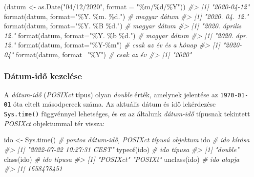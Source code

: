 \documentclass[
]{book}
\newenvironment{Shaded}{\begin{snugshade}}{\end{snugshade}}
\newcommand{\AttributeTok}[1]{\textcolor[rgb]{0.77,0.63,0.00}{#1}}
\newcommand{\CommentTok}[1]{\textcolor[rgb]{0.56,0.35,0.01}{\textit{#1}}}
\newcommand{\FunctionTok}[1]{\textcolor[rgb]{0.00,0.00,0.00}{#1}}
\newcommand{\NormalTok}[1]{#1}
\newcommand{\OtherTok}[1]{\textcolor[rgb]{0.56,0.35,0.01}{#1}}
\newcommand{\StringTok}[1]{\textcolor[rgb]{0.31,0.60,0.02}{#1}}
\begin{document}
\begin{Shaded}
\begin{Highlighting}[]
\NormalTok{(datum }\OtherTok{\textless{}{-}} \FunctionTok{as.Date}\NormalTok{(}\StringTok{"04/12/2020"}\NormalTok{, }\AttributeTok{format =} \StringTok{"\%m/\%d/\%Y"}\NormalTok{))}
\CommentTok{\#\textgreater{} [1] "2020{-}04{-}12"}
\FunctionTok{format}\NormalTok{(datum, }\AttributeTok{format=}\StringTok{"\%Y. \%m. \%d."}\NormalTok{) }\CommentTok{\# magyar dátum}
\CommentTok{\#\textgreater{} [1] "2020. 04. 12."}
\FunctionTok{format}\NormalTok{(datum, }\AttributeTok{format=}\StringTok{"\%Y. \%B \%d."}\NormalTok{)  }\CommentTok{\# magyar dátum}
\CommentTok{\#\textgreater{} [1] "2020. április 12."}
\FunctionTok{format}\NormalTok{(datum, }\AttributeTok{format=}\StringTok{"\%Y. \%b \%d."}\NormalTok{)  }\CommentTok{\# magyar dátum}
\CommentTok{\#\textgreater{} [1] "2020. ápr. 12."}
\FunctionTok{format}\NormalTok{(datum, }\AttributeTok{format=}\StringTok{"\%Y{-}\%m"}\NormalTok{)       }\CommentTok{\# csak az év és a hónap}
\CommentTok{\#\textgreater{} [1] "2020{-}04"}
\FunctionTok{format}\NormalTok{(datum, }\AttributeTok{format=}\StringTok{"\%Y"}\NormalTok{)          }\CommentTok{\# csak az év}
\CommentTok{\#\textgreater{} [1] "2020"}
\end{Highlighting}
\end{Shaded}

\hypertarget{duxe1tum-idux151-kezeluxe9se}{%
\subsubsection{Dátum-idő kezelése}\label{duxe1tum-idux151-kezeluxe9se}}

A \emph{dátum-idő} (\emph{POSIXct} típus) olyan \emph{double} érték, amelynek jelentése az \texttt{1970-01-01} óta eltelt másodpercek száma. Az aktuális dátum és idő lekérdezése \texttt{Sys.time()} függvénnyel lehetséges, és ez az általunk \emph{dátum-idő} típusnak tekintett \emph{POSIXct} objektummal tér vissza:

\begin{Shaded}
\begin{Highlighting}[]
\NormalTok{ido }\OtherTok{\textless{}{-}} \FunctionTok{Sys.time}\NormalTok{()     }\CommentTok{\# pontos dátum{-}idő, POSIXct típusú objektum}
\NormalTok{ido                   }\CommentTok{\# ido kírása}
\CommentTok{\#\textgreater{} [1] "2022{-}07{-}22 10:27:31 CEST"}
\FunctionTok{typeof}\NormalTok{(ido)           }\CommentTok{\# ido típusa}
\CommentTok{\#\textgreater{} [1] "double"}
\FunctionTok{class}\NormalTok{(ido)            }\CommentTok{\# ido típusa}
\CommentTok{\#\textgreater{} [1] "POSIXct" "POSIXt"}
\FunctionTok{unclass}\NormalTok{(ido)          }\CommentTok{\# ido alapja}
\CommentTok{\#\textgreater{} [1] 1658478451}
\end{Highlighting}
\end{Shaded}
\end{document}
